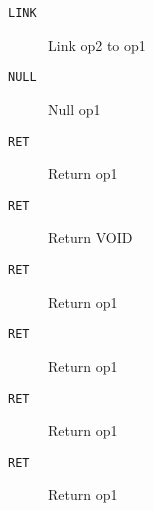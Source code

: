 \begin{description}
\item[\texttt{LINK       }]  Link op2 to op1\\
\end{description}

\begin{description}
\item[\texttt{NULL       }]  Null op1\\
\end{description}

\begin{description}
\item[\texttt{RET        }]  Return op1\\
\end{description}

\begin{description}
\item[\texttt{RET        }]  Return VOID\\
\end{description}

\begin{description}
\item[\texttt{RET        }]  Return op1\\
\end{description}

\begin{description}
\item[\texttt{RET        }]  Return op1\\
\end{description}

\begin{description}
\item[\texttt{RET        }]  Return op1\\
\end{description}

\begin{description}
\item[\texttt{RET        }]  Return op1\\
\end{description}

